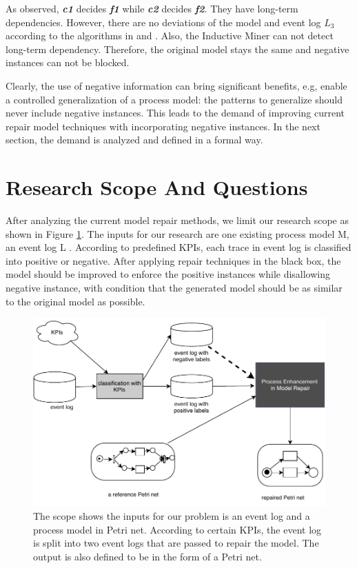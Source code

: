 As observed, \textbf{\emph{c1}} decides \textbf{\emph{f1}} while \textbf{\emph{c2}} decides \textbf{\emph{f2}}. They have long-term dependencies.
However, there are no deviations of the model and event log $L_3$ according to the  algorithms in  \cite{fahland2015model} and  \cite{dees2017enhancing}. Also, the Inductive Miner can not detect long-term dependency. Therefore, the original model stays the same and negative instances can not be blocked.

Clearly, the use of negative information can bring significant benefits, e.g, enable a controlled generalization of a process model: the patterns to generalize should never include negative instances. This leads to the demand of improving current repair model techniques with incorporating negative instances. In the next section, the demand is analyzed and defined in a formal way.

\section{Research Scope And Questions }
After analyzing the current model repair methods, we limit our research scope as shown in Figure \ref{fig:scope}.  The inputs for our research are one existing process model M, an event log L . According to predefined KPIs, each trace in event log is classified into positive or negative. After applying repair techniques in the black box, the model should be improved to enforce the positive instances while disallowing negative instance, with condition that the generated model should be as similar to the original model as possible. 
\begin{figure}
	\centering
	\includegraphics[width=\textwidth]{figures/introduction/P06-problem-scope.pdf}
	\caption[The reseach problem scope]{The scope shows the inputs for our problem is an event log and a process model in Petri net. According to certain KPIs, the event log is split into two event logs that are passed to repair the model. The output is also defined to be in the form of a Petri net. }
	\label{fig:scope}
\end{figure}

